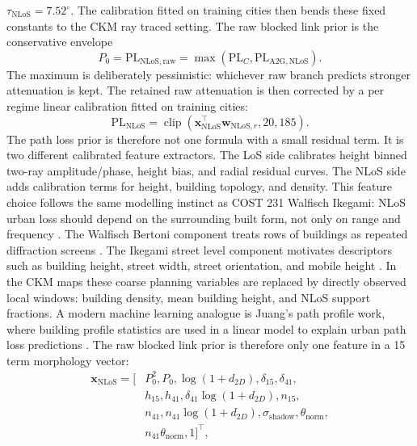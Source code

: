 \documentclass[journal]{IEEEtran}
\begin{document}
\(\tau_{\mathrm{NLoS}}=7.52^\circ\). The calibration fitted on training cities
then bends these fixed constants to the CKM ray traced setting. The raw
blocked link prior is the conservative envelope
\begin{equation}
P_0
=
\mathrm{PL}_{\mathrm{NLoS,raw}}
=
\max(\mathrm{PL}_{C},\mathrm{PL}_{\mathrm{A2G,NLoS}}).
\label{eq:nlos-raw-paper}
\end{equation}
The maximum is deliberately pessimistic: whichever raw branch predicts stronger
attenuation is kept. The retained raw attenuation is then corrected by a per
regime linear calibration fitted on training cities:
\begin{equation}
\mathrm{PL}_{\mathrm{NLoS}}
=\operatorname{clip}(\mathbf{x}_{\mathrm{NLoS}}^{\top}\mathbf{w}_{\mathrm{NLoS},r},20,185).
\label{eq:nlos-prior-paper}
\end{equation}
The path loss prior is therefore not one formula with a small residual term. It
is two different calibrated feature extractors. The LoS side calibrates
height binned two-ray amplitude/phase, height bias, and radial residual curves.
The NLoS side adds calibration terms for height, building topology, and
density. This feature choice follows the same modelling instinct as COST 231
Walfisch Ikegami: NLoS urban loss should depend on the surrounding built form,
not only on range and frequency \cite{cost231}. The Walfisch Bertoni component
treats rows of buildings as repeated diffraction screens \cite{walfisch1988}.
The Ikegami street level component motivates descriptors such as building
height, street width, street orientation, and mobile height \cite{ikegami1984}.
In the CKM maps these coarse planning variables are replaced by directly
observed local windows: building density, mean building height, and NLoS
support fractions. A modern machine learning analogue is Juang's path profile
work, where building profile statistics are used in a linear model to explain
urban path loss predictions \cite{juang2021pathprofile}. The raw blocked link
prior is therefore only one feature in a 15 term morphology vector:
\begin{equation}
\begin{aligned}
\mathbf{x}_{\mathrm{NLoS}}=[&
P_0^2,P_0,\log(1+d_{2D}),\delta_{15},\delta_{41},\\
&h_{15},h_{41},\delta_{41}\log(1+d_{2D}),n_{15},\\
&n_{41},n_{41}\log(1+d_{2D}),\sigma_{\mathrm{shadow}},
\theta_{\mathrm{norm}},\\
&n_{41}\theta_{\mathrm{norm}},1]^{\top},
\end{aligned}
\label{eq:nlos-feature-vector-paper}
\end{equation}
\end{document}
